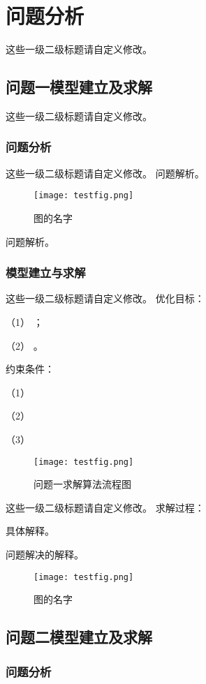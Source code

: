 \documentclass[bwprint]{gmcmthesis}
\begin{document}
\newpage
\section{问题分析}
这些一级二级标题请自定义修改。
\subsection{问题一模型建立及求解}
这些一级二级标题请自定义修改。
\subsubsection{问题分析}
这些一级二级标题请自定义修改。
问题解析。



\begin{figure}[!h]
\centering
\texttt{[image: testfig.png]}
\caption{图的名字}
\end{figure}


问题解析。

\subsubsection{模型建立与求解}
这些一级二级标题请自定义修改。
优化目标：

 （1） ；

 （2） 。

约束条件：

 （1） 

 （2） 

 （3） 

\begin{figure}[!h]
\centering
\texttt{[image: testfig.png]}
\caption{问题一求解算法流程图}
\end{figure}

这些一级二级标题请自定义修改。
求解过程：

具体解释。

问题解决的解释。

\begin{figure}[!h]
\centering
\texttt{[image: testfig.png]}
\caption{图的名字}
\end{figure}
\newpage

\subsection{问题二模型建立及求解}

\subsubsection{问题分析}
\end{document}
